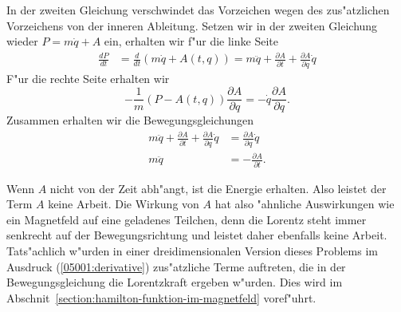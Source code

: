 \begin{loesung}
\begin{teilaufgaben}
In der zweiten Gleichung verschwindet das Vorzeichen wegen des zus"atzlichen
Vorzeichens von der inneren Ableitung.
Setzen wir in der zweiten Gleichung wieder $P=m\dot q+A$ ein, erhalten wir
f"ur die linke Seite
\begin{align*}
\frac{dP}{dt}
&=
\frac{d}{dt}(m\dot q+A(t,q))
=
m\ddot q+\frac{\partial A}{\partial t} + \frac{\partial A}{\partial q}\dot q
\end{align*}
F"ur die rechte Seite erhalten wir
\[
-\frac1m(P-A(t,q))\frac{\partial A}{\partial q}
=
-\dot q\frac{\partial A}{\partial q}.
\]
Zusammen erhalten wir die Bewegungsgleichungen
\begin{align*}
m\ddot q + \frac{\partial A}{\partial t}+\frac{\partial A}{\partial q}\dot q
&=
\frac{\partial A}{\partial q}\dot q
\\
m\ddot q
&=
-\frac{\partial A}{\partial t}.
\end{align*}
\end{teilaufgaben}
\end{loesung}

\begin{diskussion}
Wenn $A$ nicht von der Zeit abh"angt, ist die Energie erhalten.
Also leistet der Term $A$ keine Arbeit.
Die Wirkung von $A$ hat also "ahnliche Auswirkungen wie ein Magnetfeld
auf eine geladenes Teilchen,
denn die Lorentz steht immer senkrecht auf der Bewegungsrichtung und
leistet daher ebenfalls keine Arbeit.
Tats"achlich w"urden in einer dreidimensionalen Version dieses Problems
im Ausdruck (\ref{05001:derivative}) zus"atzliche Terme auftreten,
die in der Bewegungsgleichung die Lorentzkraft ergeben w"urden.
Dies wird im Abschnit~\ref{section:hamilton-funktion-im-magnetfeld}
voref"uhrt.
\end{diskussion}
 
